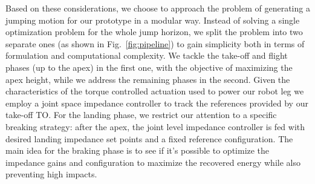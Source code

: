 Based on these considerations, we choose to approach the problem of generating a jumping motion for our prototype in a modular way. Instead of solving a single optimization problem for the whole jump horizon, we split the problem into two separate ones (as shown in Fig.~\ref{fig:pipeline}) to gain simplicity both in terms of formulation and computational complexity. We tackle the take-off and flight phases (up to the apex) in the first one, with the objective of maximizing the apex height, while we address the remaining phases in the second. Given the characteristics of the torque controlled actuation used to power our robot leg we employ a joint space impedance controller to track the references provided by our take-off TO. For the landing phase, we restrict our attention to a specific breaking strategy: after the apex, the joint level impedance controller is fed with desired landing impedance set points and a fixed reference configuration. The main idea for the braking phase is to see if it's possible to optimize the impedance gains and configuration to maximize the recovered energy while also preventing high impacts.

